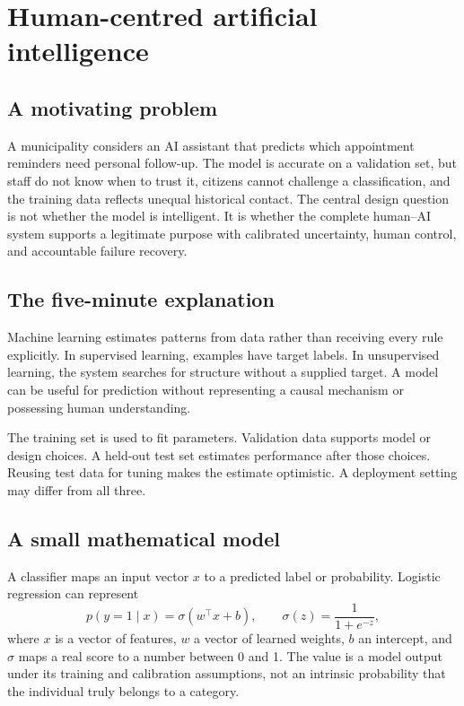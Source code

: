 \chapter{Human-centred artificial intelligence}
\label{ch:ai}

\section{A motivating problem}
A municipality considers an AI assistant that predicts which appointment reminders need personal follow-up. The model is accurate on a validation set, but staff do not know when to trust it, citizens cannot challenge a classification, and the training data reflects unequal historical contact. The central design question is not whether the model is intelligent. It is whether the complete human--AI system supports a legitimate purpose with calibrated uncertainty, human control, and accountable failure recovery.


\section{The five-minute explanation}
Machine learning estimates patterns from data rather than receiving every rule explicitly. In supervised learning, examples have target labels. In unsupervised learning, the system searches for structure without a supplied target. A model can be useful for prediction without representing a causal mechanism or possessing human understanding.

The training set is used to fit parameters. Validation data supports model or design choices. A held-out test set estimates performance after those choices. Reusing test data for tuning makes the estimate optimistic. A deployment setting may differ from all three.

\section{A small mathematical model}
A classifier maps an input vector $x$ to a predicted label or probability. Logistic regression can represent
\[
p(y=1\mid x)=\sigma(w^\top x+b), \qquad
\sigma(z)=\frac{1}{1+e^{-z}},
\]
where $x$ is a vector of features, $w$ a vector of learned weights, $b$ an intercept, and $\sigma$ maps a real score to a number between 0 and 1. The value is a model output under its training and calibration assumptions, not an intrinsic probability that the individual truly belongs to a category.


